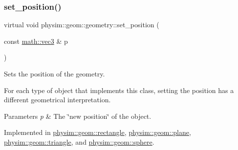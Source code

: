 \mbox{\label{classphysim_1_1geom_1_1geometry_adbd7c270a0b49c2c6d085457a20bfa69}} 
\subsubsection{\texorpdfstring{set\+\_\+position()}{set\_position()}}
{\footnotesize\ttfamily virtual void physim\+::geom\+::geometry\+::set\+\_\+position (\begin{DoxyParamCaption}\item[{const \hyperlink{structphysim_1_1math_1_1vec3}{math\+::vec3} \&}]{p }\end{DoxyParamCaption})\hspace{0.3cm}{\ttfamily [pure virtual]}}



Sets the position of the geometry. 

For each type of object that implements this class, setting the position has a different geometrical interpretation. 
\begin{DoxyParams}{Parameters}
{\em p} & The \char`\"{}new position\char`\"{} of the object. \\
\hline
\end{DoxyParams}


Implemented in \hyperlink{classphysim_1_1geom_1_1rectangle_a4e9fda61b51ce89fc073f880a7823a55}{physim\+::geom\+::rectangle}, \hyperlink{classphysim_1_1geom_1_1plane_a6922a19aee04c7a7a975c03a3601951f}{physim\+::geom\+::plane}, \hyperlink{classphysim_1_1geom_1_1triangle_a796f186962d3757ebbdee9fdfdb1ecaa}{physim\+::geom\+::triangle}, and \hyperlink{classphysim_1_1geom_1_1sphere_abaedaa499d3fe63f31935e6cd9304446}{physim\+::geom\+::sphere}.

\mbox{\label{classphysim_1_1geom_1_1geometry_a01084372e5fd738636a31b151918e7dd}} 
